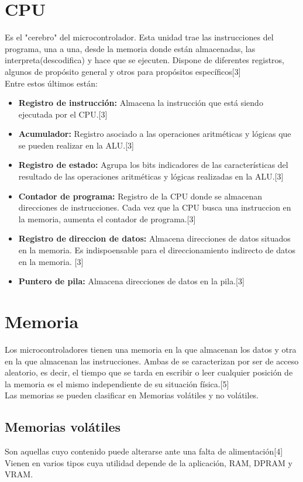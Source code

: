 \section{CPU}
Es el "cerebro" del microcontrolador. Esta unidad trae las instrucciones del programa, una a una, desde la memoria donde están almacenadas, las interpreta(descodifica) y hace que se ejecuten. Dispone de diferentes registros, algunos de propósito general y otros para propósitos específicos[3]\\
Entre estos últimos están:
\begin{itemize}
    \item \textbf{Registro de instrucción:} Almacena la instrucción que está siendo ejecutada por el CPU.[3]
    \item \textbf{Acumulador:} Registro asociado a las operaciones aritméticas y lógicas que se pueden realizar en la ALU.[3]
    \item \textbf{Registro de estado:} Agrupa los bits indicadores de las características del resultado de las operaciones aritméticas y lógicas realizadas en la ALU.[3]
    \item \textbf{Contador de programa:} Registro de la CPU donde se almacenan direcciones de instrucciones. Cada vez que la CPU busca una instruccion en la memoria, aumenta el contador de programa.[3]
    \item \textbf{Registro de direccion de datos:} Almacena direcciones de datos situados en la memoria. Es indispoensable para el direccionamiento indirecto de datos en la memoria. [3]
    \item \textbf{Puntero de pila:} Almacena direcciones de datos en la pila.[3]
\end{itemize}

\section{Memoria}
Los microcontroladores tienen una memoria en la que almacenan los datos y otra en la que almacenan las instrucciones. Ambas de se caracterizan por ser de acceso aleatorio, es decir, el tiempo que se tarda en escribir o leer cualquier posición de la memoria es el mismo independiente de su situación física.[5]\\
Las memorias se pueden clasificar en Memorias volátiles y no volátiles.
\subsection{Memorias volátiles}
Son aquellas cuyo contenido puede alterarse ante una falta de alimentación[4]\\
Vienen en varios tipos cuya utilidad depende de la aplicación, RAM, DPRAM y VRAM.
